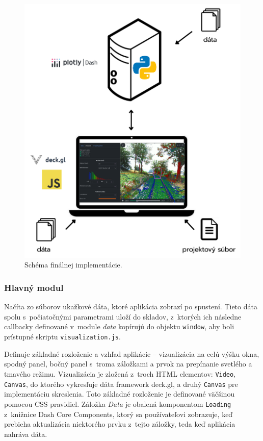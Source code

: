 \begin{figure}[t]
    \centering
    \includegraphics[width=0.7\linewidth]{text_prace/obrazky-figures/schema_implementacie.pdf}
    \caption{Schéma finálnej implementácie.}
    \label{fig:schema_implementacie}
\end{figure}

\subsubsection{Hlavný modul }

Načíta zo súborov ukažkové dáta, ktoré aplikácia zobrazí po spustení. Tieto dáta spolu s~počiatočnými parametrami uloží do skladov, z~ktorých ich následne callbacky definované v~module \emph{data} kopírujú do objektu \texttt{window}, aby boli prístupné skriptu \texttt{visualization.js}.

Definuje základné rozloženie a vzhľad aplikácie -- vizualizácia na celú výšku okna, spodný panel, bočný panel s~troma záložkami a prvok na prepínanie svetlého a tmavého režimu. Vizualizácia je zložená z~troch HTML elementov: \texttt{Video}, \texttt{Canvas}, do ktorého vykresľuje dáta framework deck.gl, a druhý \texttt{Canvas} pre implementáciu skreslenia. Toto základné rozloženie je definované väčšinou pomocou CSS pravidiel. Záložka \emph{Data} je obalená komponentom \texttt{Loading} z~knižnice Dash Core Components, ktorý sa používateľovi zobrazuje, keď prebieha aktualizácia niektorého prvku z~tejto záložky, teda keď aplikácia nahráva dáta.

